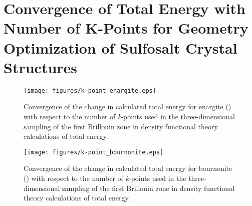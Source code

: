 \chapter{Convergence of Total Energy with Number of K-Points for Geometry Optimization of Sulfosalt Crystal Structures}\label{k-points}

\begin{figure}[h!]
  \centering
    \texttt{[image: figures/k-point\_enargite.eps]}
    \caption{Convergence of the change in calculated total energy for enargite ({\enargite}) with respect to the number of \textit{k}-points used in the three-dimensional sampling of the first Brillouin zone in density functional theory calculations of total energy.}
  \label{k-point_enargite}
\end{figure}

\begin{figure}[h!]
  \centering
    \texttt{[image: figures/k-point\_bournonite.eps]}
    \caption{Convergence of the change in calculated total energy for bournonite ({\bournonite}) with respect to the number of \textit{k}-points used in the three-dimensional sampling of the first Brillouin zone in density functional theory calculations of total energy.}
  \label{k-point_bournonite}
\end{figure}


